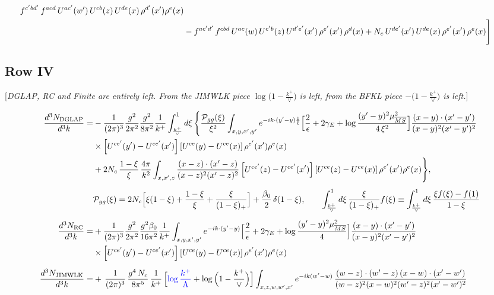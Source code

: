 \documentclass[9pt]{article}
\numberwithin{equation}{section}
\newcommand{\rnote}[1]{{\color{teal}[\textit{#1}]}}
\begin{document}
\begin{align}
f^{c'bd'}\,f^{acd}\,U^{ac'}(w')\,U^{cb}(z)\,U^{de}(x)\,\rho^{d'}(x')\rho^{e}(x) \notag \\ & -f^{ac'd'}\,f^{cbd}\,U^{ac}(w)\,U^{c'b}(z)\,U^{d'e'}(x')\,\rho^{e'}(x')\,\rho^{d}(x) +N_{c}\,U^{de'}(x')\,U^{de}(x)\,\rho^{e'}(x')\,\rho^{e}(x)\Bigg]
\end{align}

\subsection{Row IV}

\rnote{DGLAP, RC and Finite are entirely left. From the JIMWLK piece $\log\big(1-\frac{k^{+}}{\vee}\big)$ is left, from the BFKL piece $-\big(1-\frac{k^{+}}{\vee}\big)$ is left.}

\begin{align}
\frac{d^{3}N_{\rm DGLAP}}{d^{3}k}= &-\frac{1}{(2\pi)^{3}}\frac{g^{2}}{2\pi^{2}}\frac{g^{2}}{8\pi^{2}}\frac{1}{k^{+}}\int_{\frac{k^{+}}{\vee}}^{1}d\xi\,\Bigg\{\frac{\mathcal P_{gg}(\xi)}{\xi^{2}}\int_{x,y,x',y'}e^{-ik\cdot(y'-y)\frac{1}{\xi}}\Big[\frac{2}{\epsilon}+2\gamma_{E}+\log\frac{(y'-y)^{2}\mu^{2}_{\overline{MS}}}{4\,\xi^{2}}\Big]\frac{(x-y)\cdot(x'-y')}{(x-y)^{2}(x'-y')^{2}}\notag\\
&\times\left[U^{ce'}(y') - U^{ce'}(x')\right]\left[U^{ce}(y) - U^{ce}(x)\right]\rho^{e'}(x')\rho^{e}(x)\notag\\
&+2N_{c}\,\frac{1-\xi}{\xi}\,\frac{4\pi}{k^{2}}\int_{x,x',z}\frac{(x-z)\cdot(x'-z)}{(x-z)^{2}(x'-z)^{2}}\left[U^{ce'}(z) - U^{ce'}(x')\right]\left[U^{ce}(z) - U^{ce}(x)\right]\rho^{e'}(x')\rho^{e}(x)\Bigg\},\\[4pt]
&\mathcal P_{gg}(\xi)=2N_{c}\Big[\xi(1-\xi)+\frac{1-\xi}{\xi}+\frac{\xi}{(1-\xi)_{+}}\Big]+\frac{\beta_{0}}{2}\,\delta(1-\xi),\qquad
\int_{\frac{k^{+}}{\vee}}^{1}d\xi\,\frac{\xi}{(1-\xi)_{+}}f(\xi)\equiv\int_{\frac{k^{+}}{\vee}}^{1}d\xi\,\frac{\xi f(\xi)-f(1)}{1-\xi}\notag\\[6pt]
\frac{d^{3}N_{\rm RC}}{d^{3}k}= & +\frac{1}{(2\pi)^{3}}\frac{g^{2}}{2\pi^{2}}\frac{g^{2}\beta_{0}}{16\pi^{2}}\frac{1}{k^{+}}\int_{x,y,x',y'}e^{-ik\cdot(y'-y)}\Big[\frac{2}{\epsilon}+2\gamma_{E}+\log\frac{(y'-y)^{2}\mu^{2}_{\overline{MS}}}{4}\Big]\frac{(x-y)\cdot(x'-y')}{(x-y)^{2}(x'-y')^{2}}\notag\\
&\times\left[U^{ce'}(y') - U^{ce'}(x')\right]\left[U^{ce}(y) - U^{ce}(x)\right]\rho^{e'}(x')\rho^{e}(x)\\[6pt]
\frac{d^{3}N_{\rm JIMWLK}}{d^{3}k}= & +\,\frac{1}{(2\pi)^{3}}\,\frac{g^{4}\,N_{c}}{8\pi^{5}}\,\frac{1}{k^{+}}\,\Big[{\color{blue}\log\frac{k^{+}}{\Lambda}}+\log\Big(1-\frac{k^{+}}{\vee}\Big)\Big]\int_{x,z,w,w',x'}e^{-ik(w'-w)}\,\frac{(w-z)\cdot (w'-z)\,(x-w)\cdot (x'-w')}{(w-z)^{2}(x-w)^{2}(w'-z)^{2}(x'-w')^{2}}\notag\\

\end{align}
\end{document}
